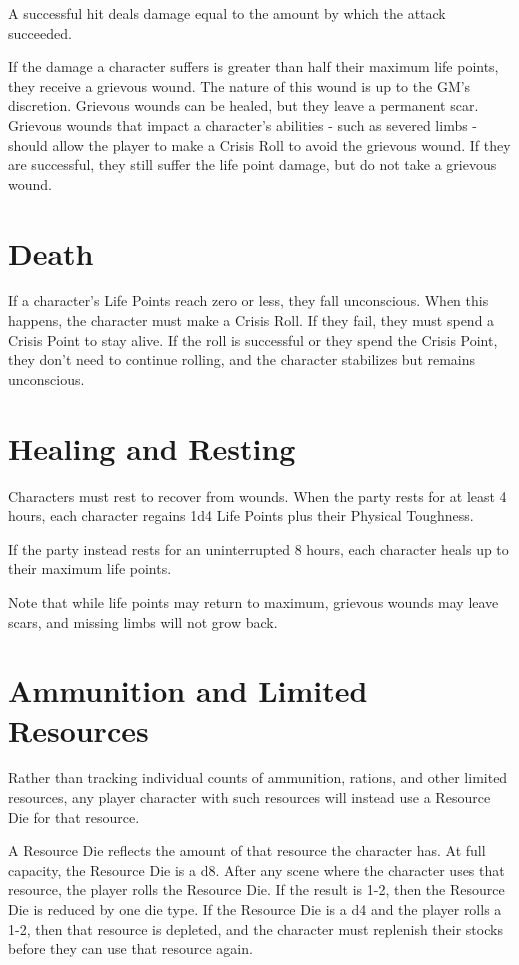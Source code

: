 \begin{multicols}{2}
A successful hit deals damage equal to the amount by which the attack succeeded.

If the damage a character suffers is greater than half their maximum life points, they receive
a grievous wound. The nature of this wound is up to the GM's discretion.
Grievous wounds can be healed, but they leave a permanent scar. Grievous wounds that impact a
character's abilities - such as severed limbs - should allow the player to make a Crisis Roll
to avoid the grievous wound. If they are successful, they still suffer the life point damage,
but do not take a grievous wound.

\section{Death}

If a character's Life Points reach zero or less, they fall unconscious. When this happens,
the character must make a Crisis Roll. If they fail, they must spend a Crisis Point to stay
alive. If the roll is successful or they spend the Crisis Point, they don't need to continue
rolling, and the character stabilizes but remains unconscious.

\section{Healing and Resting}

Characters must rest to recover from wounds. When the party rests for at least 4 hours, each
character regains 1d4 Life Points plus their Physical Toughness.

If the party instead rests for an uninterrupted 8 hours, each character heals up to their maximum
life points.

Note that while life points may return to maximum, grievous wounds may leave scars, and missing
limbs will not grow back.

\section{Ammunition and Limited Resources}

Rather than tracking individual counts of ammunition, rations, and other limited resources, any
player character with such resources will instead use a Resource Die for that resource.

A Resource Die reflects the amount of that resource the character has. At full capacity, the
Resource Die is a d8. After any scene where the character uses that resource, the player rolls
the Resource Die. If the result is 1-2, then the Resource Die is reduced by one die type. If
the Resource Die is a d4 and the player rolls a 1-2, then that resource is depleted, and the character
must replenish their stocks before they can use that resource again.


\end{multicols}
